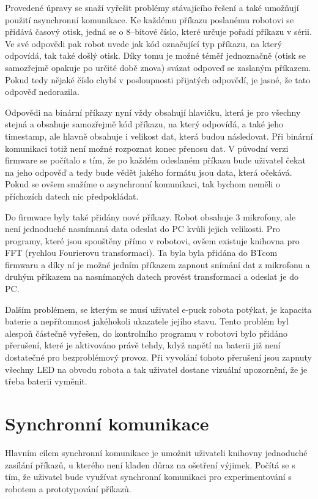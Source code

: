 \documentclass[12pt,notitlepage]{report}
\begin{document}
    Provedené úpravy se snaží vyřešit problémy stávajícího řešení a také
    umožňují použití asynchronní komunikace. Ke každému příkazu poslanému
    robotovi se přidává časový otisk, jedná se o 8--bitové číslo, které určuje
    pořadí příkazu v sérii. Ve své odpovědi pak robot uvede jak kód označující
    typ příkazu, na který odpovídá, tak také došlý otisk. Díky tomu je možné
    téměř jednoznačně (otisk se samozřejmě opakuje po určité době znova) svázat
    odpoveď se zaslaným příkazem. Pokud tedy nějaké číslo chybí v posloupnosti
    přijatých odpovědí, je jasné, že tato odpověď nedorazila.

    Odpovědi na binární příkazy nyní vždy obsahují hlavičku, která je pro
    všechny stejná a obsahuje samozřejmě kód příkazu, na který odpovídá, a také
    jeho timestamp, ale hlavně obsahuje i velikost dat, která budou následovat.
    Při binární komunikaci totiž není možné rozpoznat konec přenosu dat. V
    původní verzi firmware se počítalo s tím, že po každém odeslaném příkazu
    bude uživatel čekat na jeho odpověď a tedy bude vědět jakého formátu jsou
    data, která očekává. Pokud se ovšem snažíme o asynchronní komunikaci, tak
    bychom neměli o příchozích datech nic předpokládat.

    Do firmware byly také přidány nové příkazy. Robot obsahuje 3 mikrofony, ale
    není jednoduché nasnímaná data odeslat do PC kvůli jejich velikosti. Pro
    programy, které jsou spouštěny přímo v robotovi, ovšem existuje knihovna
    pro FFT (rychlou Fourierovu transformaci). Ta byla byla přidána do BTcom
    firmwaru a díky ní je možné jedním příkazem zapnout snímání dat z mikrofonu
    a druhým příkazem na nasnímaných datech provést transformaci a odeslat je
    do PC.

    Dalším problémem, se kterým se musí uživatel e-puck robota potýkat, je
    kapacita baterie a nepřítomnost jakéhokoli ukazatele jejího stavu. Tento
    problém byl alespoň částečně vyřešen, do kontrolního programu v robotovi
    bylo přidáno přerušení, které je aktivováno právě tehdy, když napětí na
    baterii již není dostatečné pro bezproblémový provoz. Při vyvolání tohoto
    přerušení jsou zapnuty všechny LED na obvodu robota a tak uživatel dostane
    vizuální upozornění, že je třeba baterii vyměnit.

    \section{Synchronní komunikace}

    Hlavním cílem synchronní komunikace je umožnit uživateli knihovny
    jednoduché zasílání příkazů, u kterého není kladen důraz na ošetření
    výjimek. Počítá se s tím, že uživatel bude využívat synchronní komunikaci
    pro experimentování s robotem a prototypování příkazů.
\end{document}
